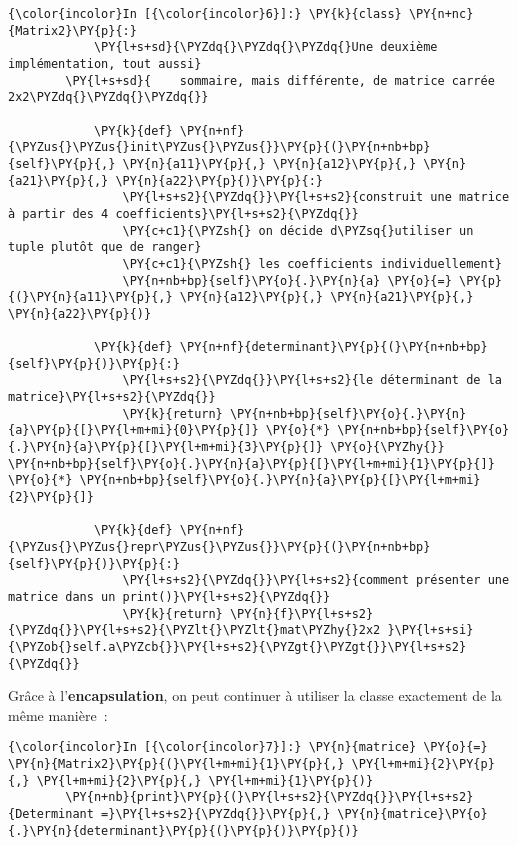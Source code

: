     \begin{Verbatim}[commandchars=\\\{\},frame=single,framerule=0.3mm,rulecolor=\color{cellframecolor}]
{\color{incolor}In [{\color{incolor}6}]:} \PY{k}{class} \PY{n+nc}{Matrix2}\PY{p}{:}
            \PY{l+s+sd}{\PYZdq{}\PYZdq{}\PYZdq{}Une deuxième implémentation, tout aussi}
        \PY{l+s+sd}{    sommaire, mais différente, de matrice carrée 2x2\PYZdq{}\PYZdq{}\PYZdq{}}
            
            \PY{k}{def} \PY{n+nf}{\PYZus{}\PYZus{}init\PYZus{}\PYZus{}}\PY{p}{(}\PY{n+nb+bp}{self}\PY{p}{,} \PY{n}{a11}\PY{p}{,} \PY{n}{a12}\PY{p}{,} \PY{n}{a21}\PY{p}{,} \PY{n}{a22}\PY{p}{)}\PY{p}{:}
                \PY{l+s+s2}{\PYZdq{}}\PY{l+s+s2}{construit une matrice à partir des 4 coefficients}\PY{l+s+s2}{\PYZdq{}}
                \PY{c+c1}{\PYZsh{} on décide d\PYZsq{}utiliser un tuple plutôt que de ranger}
                \PY{c+c1}{\PYZsh{} les coefficients individuellement}
                \PY{n+nb+bp}{self}\PY{o}{.}\PY{n}{a} \PY{o}{=} \PY{p}{(}\PY{n}{a11}\PY{p}{,} \PY{n}{a12}\PY{p}{,} \PY{n}{a21}\PY{p}{,} \PY{n}{a22}\PY{p}{)}
                
            \PY{k}{def} \PY{n+nf}{determinant}\PY{p}{(}\PY{n+nb+bp}{self}\PY{p}{)}\PY{p}{:}
                \PY{l+s+s2}{\PYZdq{}}\PY{l+s+s2}{le déterminant de la matrice}\PY{l+s+s2}{\PYZdq{}}
                \PY{k}{return} \PY{n+nb+bp}{self}\PY{o}{.}\PY{n}{a}\PY{p}{[}\PY{l+m+mi}{0}\PY{p}{]} \PY{o}{*} \PY{n+nb+bp}{self}\PY{o}{.}\PY{n}{a}\PY{p}{[}\PY{l+m+mi}{3}\PY{p}{]} \PY{o}{\PYZhy{}} \PY{n+nb+bp}{self}\PY{o}{.}\PY{n}{a}\PY{p}{[}\PY{l+m+mi}{1}\PY{p}{]} \PY{o}{*} \PY{n+nb+bp}{self}\PY{o}{.}\PY{n}{a}\PY{p}{[}\PY{l+m+mi}{2}\PY{p}{]}
            
            \PY{k}{def} \PY{n+nf}{\PYZus{}\PYZus{}repr\PYZus{}\PYZus{}}\PY{p}{(}\PY{n+nb+bp}{self}\PY{p}{)}\PY{p}{:}
                \PY{l+s+s2}{\PYZdq{}}\PY{l+s+s2}{comment présenter une matrice dans un print()}\PY{l+s+s2}{\PYZdq{}}
                \PY{k}{return} \PY{n}{f}\PY{l+s+s2}{\PYZdq{}}\PY{l+s+s2}{\PYZlt{}\PYZlt{}mat\PYZhy{}2x2 }\PY{l+s+si}{\PYZob{}self.a\PYZcb{}}\PY{l+s+s2}{\PYZgt{}\PYZgt{}}\PY{l+s+s2}{\PYZdq{}}
\end{Verbatim}


    Grâce à l'\textbf{encapsulation}, on peut continuer à utiliser la classe
exactement de la même manière~:

    \begin{Verbatim}[commandchars=\\\{\},frame=single,framerule=0.3mm,rulecolor=\color{cellframecolor}]
{\color{incolor}In [{\color{incolor}7}]:} \PY{n}{matrice} \PY{o}{=} \PY{n}{Matrix2}\PY{p}{(}\PY{l+m+mi}{1}\PY{p}{,} \PY{l+m+mi}{2}\PY{p}{,} \PY{l+m+mi}{2}\PY{p}{,} \PY{l+m+mi}{1}\PY{p}{)}
        \PY{n+nb}{print}\PY{p}{(}\PY{l+s+s2}{\PYZdq{}}\PY{l+s+s2}{Determinant =}\PY{l+s+s2}{\PYZdq{}}\PY{p}{,} \PY{n}{matrice}\PY{o}{.}\PY{n}{determinant}\PY{p}{(}\PY{p}{)}\PY{p}{)}
\end{Verbatim}


